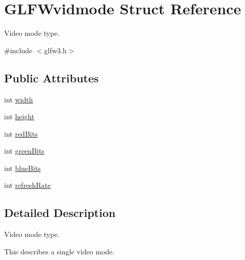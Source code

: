 \hypertarget{structGLFWvidmode}{\section{\-G\-L\-F\-Wvidmode \-Struct \-Reference}
\label{structGLFWvidmode}
}


\-Video mode type.  




{\ttfamily \#include $<$glfw3.\-h$>$}

\subsection*{\-Public \-Attributes}
\begin{DoxyCompactItemize}
\item 
int \hyperlink{structGLFWvidmode_a698dcb200562051a7249cb6ae154c71d}{width}
\item 
int \hyperlink{structGLFWvidmode_ac65942a5f6981695517437a9d571d03c}{height}
\item 
int \hyperlink{structGLFWvidmode_a6066c4ecd251098700062d3b735dba1b}{red\-Bits}
\item 
int \hyperlink{structGLFWvidmode_a292fdd281f3485fb3ff102a5bda43faa}{green\-Bits}
\item 
int \hyperlink{structGLFWvidmode_af310977f58d2e3b188175b6e3d314047}{blue\-Bits}
\item 
int \hyperlink{structGLFWvidmode_a791bdd6c7697b09f7e9c97054bf05649}{refresh\-Rate}
\end{DoxyCompactItemize}


\subsection{\-Detailed \-Description}
\-Video mode type. 

\-This describes a single video mode. 

